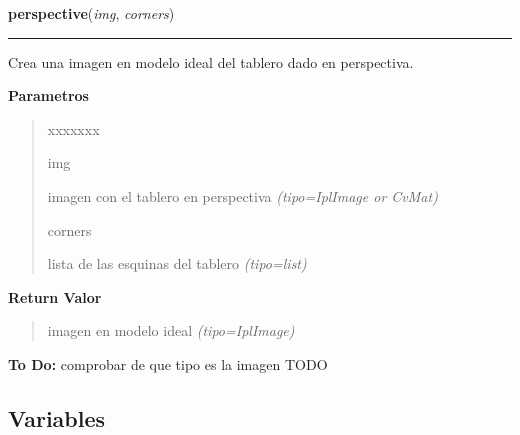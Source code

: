 \hspace{.8\funcindent}\begin{boxedminipage}{\funcwidth}

    \raggedright \textbf{perspective}(\textit{img}, \textit{corners})

    \vspace{-1.5ex}

    \rule{\textwidth}{0.5\fboxrule}
\setlength{\parskip}{2ex}
Crea una imagen en modelo ideal del tablero dado en perspectiva.

\setlength{\parskip}{1ex}
      \textbf{Parametros}
      \vspace{-1ex}

      \begin{quote}
        \begin{Ventry}{xxxxxxx}

          \item[img]


imagen con el tablero en perspectiva
            {\it (tipo=IplImage or CvMat)}

          \item[corners]


lista de las esquinas del tablero
            {\it (tipo=list)}

        \end{Ventry}

      \end{quote}

      \textbf{Return Valor}
    \vspace{-1ex}

      \begin{quote}

imagen en modelo ideal
      {\it (tipo=IplImage)}

      \end{quote}

\textbf{To Do:} 
comprobar de que tipo es la imagen TODO


    \end{boxedminipage}



  \subsection{Variables}

